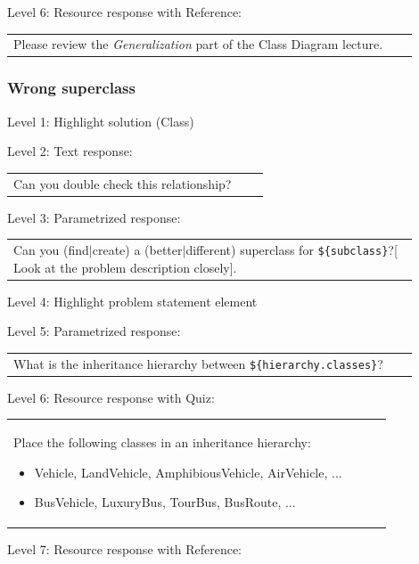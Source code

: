 \noindent Level 6: Resource response with Reference: \medskip

\begin{tabular}{|p{0.9\linewidth}}
Please review the \textit{Generalization} part of the Class Diagram lecture.
\end{tabular} \medskip


\subsubsection{Wrong superclass}

\noindent Level 1: Highlight solution (Class) \medskip

\noindent Level 2: Text response: \medskip

\begin{tabular}{|p{0.9\linewidth}}
Can you double check this relationship?
\end{tabular} \medskip

\noindent Level 3: Parametrized response: \medskip

\begin{tabular}{|p{0.9\linewidth}}
Can you (find$|$create) a (better$|$different) superclass for \verb|${subclass}|?[ Look at the problem description closely].
\end{tabular} \medskip

\noindent Level 4: Highlight problem statement element \medskip

\noindent Level 5: Parametrized response: \medskip

\begin{tabular}{|p{0.9\linewidth}}
What is the inheritance hierarchy between \verb|${hierarchy.classes}|?
\end{tabular} \medskip

\noindent Level 6: Resource response with Quiz: \medskip

\begin{tabular}{|p{0.9\linewidth}}
Place the following classes in an inheritance hierarchy:

\begin{itemize}
    \item Vehicle, LandVehicle, AmphibiousVehicle, AirVehicle, ...
    \item BusVehicle, LuxuryBus, TourBus, BusRoute, ...
\end{itemize}

\end{tabular} \medskip

\noindent Level 7: Resource response with Reference: \medskip

